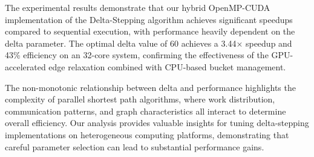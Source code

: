 \documentclass{article}
\begin{document}
The experimental results demonstrate that our hybrid OpenMP-CUDA implementation of the Delta-Stepping algorithm achieves significant speedups compared to sequential execution, with performance heavily dependent on the delta parameter. The optimal delta value of 60 achieves a 3.44× speedup and 43\% efficiency on an 32-core system, confirming the effectiveness of the GPU-accelerated edge relaxation combined with CPU-based bucket management.

The non-monotonic relationship between delta and performance highlights the complexity of parallel shortest path algorithms, where work distribution, communication patterns, and graph characteristics all interact to determine overall efficiency. Our analysis provides valuable insights for tuning delta-stepping implementations on heterogeneous computing platforms, demonstrating that careful parameter selection can lead to substantial performance gains.
\end{document}

